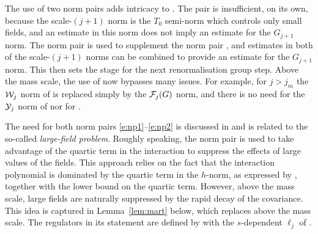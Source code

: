 The use of two norm pairs adds intricacy to \cite{BS-rg-IE,BS-rg-step}.
The pair  is insufficient, on its own, because the scale-$(j+1)$ norm
is the $T_0$ semi-norm which controls only small fields, and an estimate in this norm
does not imply an estimate for the $G_{j+1}$ norm.  The norm pair  is
used to supplement the norm pair , and estimates in both of the scale-$(j+1)$
norms can be combined to provide an estimate for the $G_{j+1}$ norm.  This then
sets the stage for the next renormalisation group step.  Above the mass scale,
the use of  now bypasses many issues.  For example, for $j>j_m$
 the $\mathcal{W}_j$ norm of \cite[\eqref{step-e:9Kcalnorm}]{BS-rg-step} is replaced
 simply by the $\mathcal{F}_j(G)$ norm, and there is no need for the $\mathcal{Y}_j$ norm of
\cite[\eqref{step-e:Ycaldef}]{BS-rg-step} nor for \cite[Lemma~\ref{step-lem:KKK}]{BS-rg-step}.

The need for both norm pairs \eqref{e:np1}--\eqref{e:np2} is discussed in
\cite[Section~\ref{IE-sec:lfp}]{BS-rg-IE} and is related to the
so-called \emph{large-field problem}. Roughly speaking, the
norm pair  is used to take advantage of the quartic term in the interaction to
suppress the effects of large values of the fields. This approach
relies on the fact that the interaction polynomial is dominated by the
quartic term in the $h$-norm, as expressed by
\cite[\eqref{IE-e:tau2dom}]{BS-rg-IE}, together with the lower bound
\cite[\eqref{IE-e:epVbark0}]{BS-rg-IE} on the quartic term.
However, above the mass scale, large fields are naturally suppressed
by the rapid decay of the covariance.
This idea is captured in Lemma~\ref{lem:mart} below, which replaces
\cite[Lemma~\ref{IE-lem:mart}]{BS-rg-IE} above the mass scale.
The regulators in its statement are defined by  with the $s$-dependent
$\ell_j$ of .


